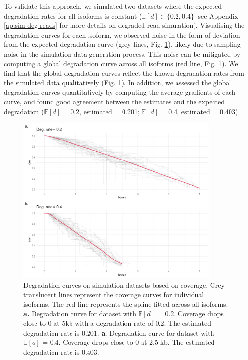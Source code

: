 To validate this approach, we simulated two datasets where the expected degradation rates for all isoforms is constant ($\mathbb{E}[d]\in\{0.2,0.4\}$, see Appendix \ref{ap:sim-deg-reads} for more details on degraded read simulation). Visualising the degradation curves for each isoform, we observed noise in the form of deviation from the expected degradation curve (grey lines, Fig. \ref{fig:cov-sim}), likely due to sampling noise in the simulation data generation process. This noise can be mitigated by computing a global degradation curve across all isoforms (red line, Fig. \ref{fig:cov-sim}). We find that the global degradation curves reflect the known degradation rates from the simulated data qualitatively (Fig. \ref{fig:cov-sim}). In addition, we assessed the global degradation curves quantitatively by computing the average gradients of each curve, and found good agreement between the estimates and the expected degradation ($\mathbb{E}[d]$ = 0.2, estimated = 0.201; $\mathbb{E}[d]$ = 0.4, estimated = 0.403).

\begin{figure}[H]
    \centering
    \includegraphics[width=0.9\textwidth]{figures/sec-2-cov-sim.png}
    \caption[Degradation curves on simulation datasets based on coverage]{Degradation curves on simulation datasets based on coverage. Grey translucent lines represent the coverage curves for individual isoforms. The red line represents the spline fitted across all isoforms. \textbf{a.} Degradation curve for dataset with $\mathbb{E}[d]$ = 0.2. Coverage drops close to 0 at 5kb with a degradation rate of 0.2. The estimated degradation rate is 0.201. \textbf{a.} Degradation curve for dataset with $\mathbb{E}[d]$ = 0.4. Coverage drops close to 0 at 2.5 kb. The estimated degradation rate is 0.403.}
    \label{fig:cov-sim}
\end{figure}

